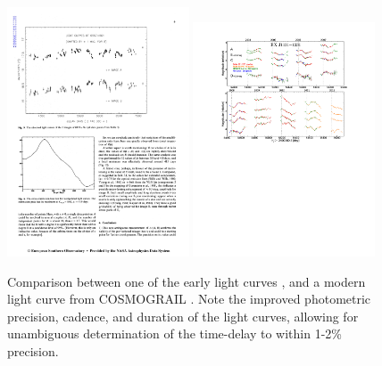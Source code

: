 \begin{figure}
\includegraphics[width=0.48\textwidth]{figures/Vanderriest89_fig5.pdf}
\includegraphics[width=0.48\textwidth]{figures/Tewes13-fig4.pdf}
\caption{Comparison between one of the early light curves \citep[left panel, from][]{Van89}, and a modern light curve from COSMOGRAIL \citep[right panel, from][]{Tew++13}. Note the improved photometric precision, cadence, and duration of the light curves, allowing for unambiguous determination of the time-delay to within 1-2\% precision.}
\label{fig:oldvsmoderndt}
\end{figure}

